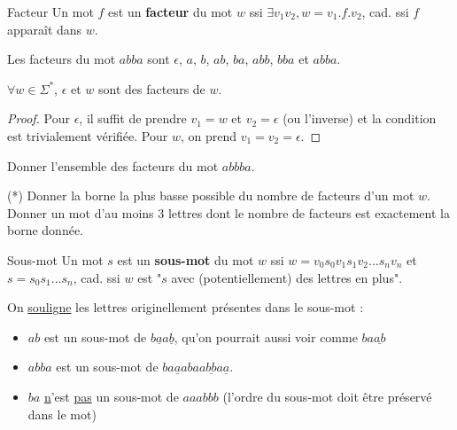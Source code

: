 \begin{definition}{Facteur}{}
Un mot $f$ est un \textbf{facteur} du mot $w$ ssi $\exists v_1 v_2, w = v_1.f.v_2$, cad. ssi $f$ apparaît dans $w$.
\end{definition}

\begin{example}
Les facteurs du mot $abba$ sont $\epsilon$, $a$, $b$, $ab$, $ba$, $abb$, $bba$ et $abba$. 
\end{example}

\begin{lemma}
$\forall w \in \Sigma^*$, $\epsilon$ et $w$ sont des facteurs de $w$.
\end{lemma}

\begin{proof}
Pour $\epsilon$, il suffit de prendre $v_1 = w$ et $v_2 = \epsilon$ (ou l'inverse) et la condition est trivialement vérifiée. Pour $w$, on prend $v_1 = v_2 = \epsilon$.
\end{proof}

\begin{exercice}
Donner l'ensemble des facteurs du mot $abbba$.
\end{exercice}

\begin{exercice} \label{exfact}(*)
Donner la borne la plus basse possible du nombre de facteurs d'un mot $w$. Donner un mot d'au moins 3 lettres dont le nombre de facteurs est exactement la borne donnée.
\end{exercice}

\begin{definition}{Sous-mot}{}
Un mot $s$ est un \textbf{sous-mot} du mot $w$ ssi $w = v_0s_0v_1s_1v_2...s_nv_n$ et $s = s_0s_1...s_n$, cad. ssi $w$ est "$s$ avec (potentiellement) des lettres en plus".
\end{definition}

\begin{example}\label{ex5} On \underline{souligne} les lettres originellement présentes dans le sous-mot :
\begin{itemize}
   \item $ab$ est un sous-mot de $b\underline{a}a\underline{b}$, qu'on pourrait aussi voir comme $ba\underline{ab}$
   \item $abba$ est un sous-mot de $ba\underline{a}abaa\underline{bb}a\underline{a}$.
   \item $ba$ \underline{n}'est \underline{pas} un sous-mot de $aaabbb$ (l'ordre du sous-mot doit être préservé dans le mot) 
\end{itemize}
\end{example}


